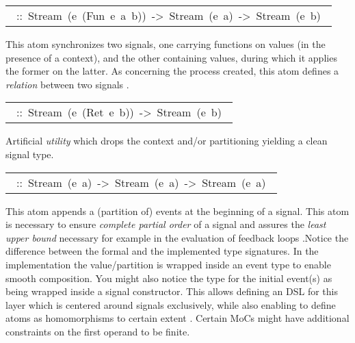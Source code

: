 \begin{haddockdesc}
\begin{haddockdesc}
\item[\begin{tabular}{@{}l}\haddockid{(-*-)}\ ::\ Stream\ (e\ (Fun\ e\ a\ b))\ ->\ Stream\ (e\ a)\ ->\ Stream\ (e\ b)\ \end{tabular}]
\haddockbegindoc
This atom synchronizes two signals, one carrying functions on values (in the presence of a context), and the other containing values, during which it applies the former on the latter. As concerning the process created, this atom defines a \emph{relation} between two signals  \cite{Lee98}.\par

\item[\begin{tabular}{@{}l}\haddockid{(-*)}\ ::\ Stream\ (e\ (Ret\ e\ b))\ ->\ Stream\ (e\ b)\ \end{tabular}]
\haddockbegindoc
Artificial \emph{utility} which drops the context and/or partitioning yielding a clean signal type.\par

\item[\begin{tabular}{@{}l}\haddockid{(-<-)}\ ::\ Stream\ (e\ a)\ ->\ Stream\ (e\ a)\ ->\ Stream\ (e\ a)\ \end{tabular}]
\haddockbegindoc
This atom appends a (partition of) events at the beginning of a signal. This atom is necessary to ensure \emph{complete partial order} of a signal and assures the \emph{least upper bound} necessary for example in the evaluation of feedback loops  \cite{Lee98}.Notice the difference between the formal and the implemented type signatures. In the implementation the value/partition is wrapped inside an event type to enable smooth composition. You might also notice the type for the initial event(s) as being wrapped inside a signal constructor. This allows defining an DSL for this layer which is centered around signals exclusively, while also enabling to define atoms as homomorphisms to certain extent  \cite{Bird97}. Certain MoCs might have additional constraints on the first operand to be finite.\par


\end{haddockdesc}
\end{haddockdesc}
